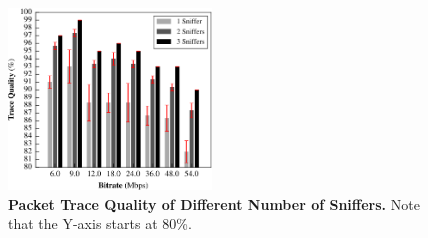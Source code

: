 \begin{figure}[t!]
  \centering
  \includegraphics[width=0.48\textwidth]{./figures/CaptureQualityFigure.pdf}
  \caption{\textbf{Packet Trace Quality of Different Number of Sniffers.} Note
  that the Y-axis starts at 80\%.}
  \label{fig:quality}
\end{figure}
